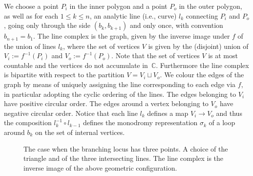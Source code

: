 \documentclass[pdftex]{sigma}
\numberwithin{equation}{section}
\begin{document}
We choose a point $P_i$ in the inner polygon and a point $P_o$ in the outer polygon, as well as for each
$1\leq k\leq n$, an analytic line (i.e., curve) $l_k$ connecting $P_i$ and $P_o$, going only through the side $(b_k,b_{k+1})$
and only once, with convention $b_{n+1}=b_1$. The line complex is the graph, given by the inverse image under $f$
of the union of lines $l_k$, where the set of vertices $V$ is given by the (disjoint) union of $V_i:=f^{-1}(P_i)$ and $V_o:=f^{-1}(P_o)$.
Note that the set of vertices $V$ is at most countable and the vertices do not accumulate in~$\mathbb{C}$. Furthermore the line complex is bipartite with respect to the partition $V=V_i\sqcup V_o$. We colour the edges of the graph by means of uniquely assigning the line corresponding to each edge via $f$, in particular adopting the cyclic ordering of the lines. The edges belonging to $V_i$ have positive circular order. The edges around a vertex belonging to $V_o$ have negative circular order. Notice that each line $l_k$ def\/ines a map $V_i \to V_o$ and thus the composition $l_k^{-1}\circ l_{k-1}$ def\/ines the monodromy representation $\sigma_k$ of a loop around $b_k$ on the set of internal vertices.
\begin{figure}[htpb]
	\centering\vspace*{-7mm}
	\vspace{-7mm}
	\caption{The case when the branching locus has three points. A choice of the triangle and of the three intersecting lines.
	The line complex is the inverse image of the above geometric conf\/iguration.} \label{fig:linecomplex}
\end{figure}
\end{document}
